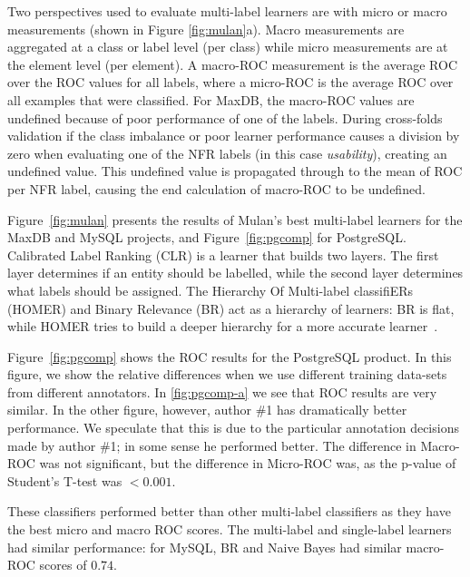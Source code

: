 \documentclass[smallextended]{svjour3}       %
\begin{document}
Two perspectives used to evaluate multi-label learners are with micro or macro measurements (shown in Figure \ref{fig:mulan}a).
Macro measurements are aggregated at a class or label level (per class) while micro measurements are at the element level (per element).
A macro-ROC measurement is the average ROC over the ROC values for all labels, where a micro-ROC is the average ROC over all examples that were classified. 
For MaxDB, the macro-ROC values are undefined because of poor
performance of one of the labels.%
During cross-folds validation if the class imbalance or poor learner
performance causes a division by zero when evaluating one of the NFR
labels (in this case \emph{usability}), creating an undefined
value. This undefined 
value is propagated through to the mean of ROC per NFR label, causing
the end calculation of macro-ROC to be undefined.

Figure~\ref{fig:mulan} presents the results of Mulan's best multi-label learners for the MaxDB and MySQL projects, and  Figure~\ref{fig:pgcomp} for PostgreSQL. 
Calibrated Label Ranking (CLR) is a learner that builds two layers. The first layer determines if an entity should be labelled, while the second layer
determines what labels should be assigned.
The Hierarchy Of Multi-label classifiERs (HOMER) and Binary Relevance (BR) act as a hierarchy of learners: BR is flat, while HOMER tries to build a
deeper hierarchy for a more accurate learner~\cite{mulan}. 

Figure~\ref{fig:pgcomp} shows the ROC results for the PostgreSQL
product. In this figure, we show the relative differences when we use
different training data-sets from different annotators. In \ref{fig:pgcomp-a} we see that ROC
results are very similar. In the other figure, however, author \#1 has
dramatically better performance. We speculate that this is due to the
particular annotation decisions made by author \#1; in some sense he
performed better. 
The difference in Macro-ROC was not significant, but the difference in
Micro-ROC was, as the p-value of Student's T-test was $< 0.001$. 

These classifiers performed better than other multi-label classifiers as they have the best micro and macro ROC scores. 
The multi-label and single-label learners had similar performance: for
MySQL, BR and Naive Bayes had similar macro-ROC scores of $0.74$.
\end{document}
